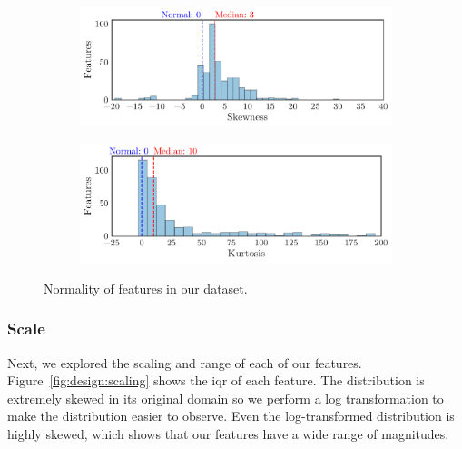 \documentclass[../thesis/thesis.tex]{subfiles}
\begin{document}
\begin{figure}[!htb]
    \centering
    \begin{subfigure}{\textwidth}
        \includegraphics[width=\textwidth]{../figures/design/distribution_skew}
        \caption[Distribution of skewness by feature]{}
        \label{fig:design:normality:skew}
    \end{subfigure}
    \begin{subfigure}{\textwidth}
        \includegraphics[width=\textwidth]{../figures/design/distribution_kurtosis}
        \caption[Distribution of kurtosis by feature]{}
        \label{fig:design:normality:kurtosis}
    \end{subfigure}
    \caption[Distribution of skewness and kurtosis]{Normality of features in our dataset.}
    \label{fig:design:normality}
\end{figure}

\subsubsection{Scale}

Next, we explored the scaling and range of each of our features. Figure~\ref{fig:design:scaling} shows the \gls{iqr} of each feature. The distribution is extremely skewed in its original domain so we perform a log transformation to make the distribution easier to observe. Even the log-transformed distribution is highly skewed, which shows that our features have a wide range of magnitudes.
\end{document}
